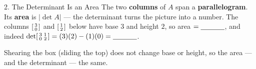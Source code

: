 \documentclass[10pt]{article}
\begin{document}
\begin{notesbox}{2. The Determinant Is an Area}
The two \textbf{columns} of $A$ span a \textbf{parallelogram}. Its \textbf{area} is $|\det A|$ ---
the determinant turns the picture into a number. The columns
$\begin{bsmallmatrix} 3\\0 \end{bsmallmatrix}$ and $\begin{bsmallmatrix} 1\\2 \end{bsmallmatrix}$
below have base $3$ and height $2$, so area $=\blank{1.2cm}$, and indeed
$\det\begin{bsmallmatrix} 3 & 1\\ 0 & 2 \end{bsmallmatrix}=(3)(2)-(1)(0)=\blank{1.2cm}$.

\begin{center}
\end{center}
Shearing the box (sliding the top) does not change base or height, so the area --- and the
determinant --- \blank{2.6cm} the same.
\end{notesbox}
\end{document}
